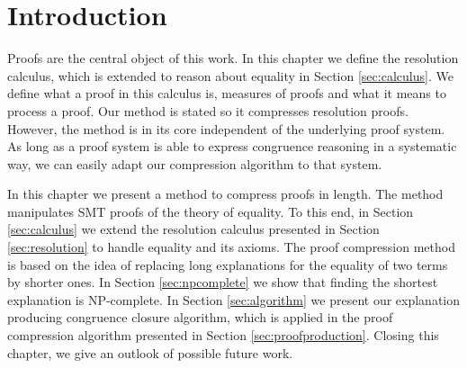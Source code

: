 \section{Introduction}

Proofs are the central object of this work.
In this chapter we define the resolution calculus, which is extended to reason about equality in Section \ref{sec:calculus}.
We define what a proof in this calculus is, measures of proofs and what it means to process a proof.
Our method is stated so it compresses resolution proofs.
However, the method is in its core independent of the underlying proof system.
As long as a proof system is able to express congruence reasoning in a systematic way, we can easily adapt our compression algorithm to that system.

In this chapter we present a method to compress proofs in length.
The method manipulates SMT proofs of the theory of equality.
To this end, in Section \ref{sec:calculus} we extend the resolution calculus presented in 
Section \ref{sec:resolution} to handle equality and its axioms.
The proof compression method is based on the idea of replacing long explanations for the equality of two terms by shorter ones.
In Section \ref{sec:npcomplete} we show that finding the shortest explanation is NP-complete.
In Section \ref{sec:algorithm} we present our explanation producing congruence closure algorithm, which is applied in the proof compression algorithm presented in Section \ref{sec:proofproduction}.
Closing this chapter, we give an outlook of possible future work.

